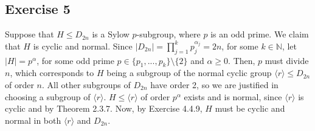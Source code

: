 \subsection*{Exercise 5}
Suppose that $H \le D_{2n}$ is a Sylow $p$-subgroup, where $p$ is an odd prime. We claim that $H$ is cyclic and normal. Since $|D_{2n}| = \prod_{j=1}^k p_j^{\alpha_j} = 2n$, for some $k \in \mathbb{N}$, let $|H| = p^{\alpha}$, for some odd prime $p \in \{p_1,...,p_k\} \setminus \{2\}$ and $\alpha \ge 0$. Then, $p$ must divide $n$, which corresponds to $H$ being a subgroup of the normal cyclic group $\langle r \rangle \le D_{2n}$ of order $n$. All other subgroups of $D_{2n}$ have order 2, so we are justified in choosing a subgroup of $\langle r \rangle$. $H \le \langle r \rangle$ of order $p^\alpha$ exists and is normal, since $\langle r \rangle$ is cyclic and by Theorem 2.3.7. Now, by Exercise 4.4.9, $H$ must be cyclic and normal in both $\langle r \rangle$ and $D_{2n}$.